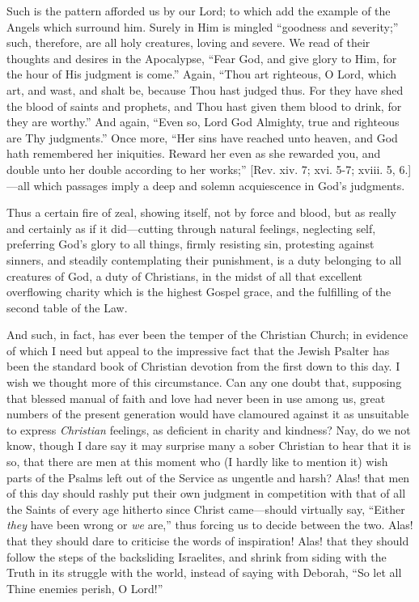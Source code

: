 Such is the pattern afforded us by our Lord; to which add the
example of the Angels which surround him. Surely in Him is mingled
``goodness and severity;'' such, therefore, are all holy
creatures, loving and severe. We read of their thoughts and desires in
the Apocalypse, ``Fear God, and give glory to Him, for the hour of
His judgment is come.'' Again, ``Thou art righteous, O Lord,
which art, and wast, and shalt be, because Thou hast judged thus. For
they have shed the blood of saints and prophets, and Thou hast given
them blood to drink, for they are worthy.'' And again, ``Even
so, Lord God Almighty, true and righteous are Thy judgments.''
Once more, ``Her sins have reached unto heaven, and God hath
remembered her iniquities. Reward her even as she rewarded you, and
double unto her double according to her works;'' [Rev. xiv. 7;
xvi. 5-7; xviii. 5, 6.]—all which passages imply a deep and solemn
acquiescence in God's judgments.

Thus a certain fire of zeal, showing itself, not by force and
blood, but as really and certainly as if it did—cutting through
natural feelings, neglecting self, preferring God's glory to all
things, firmly resisting sin, protesting against sinners, and steadily
contemplating their punishment, is a duty belonging to all creatures
of God, a duty of Christians, in the midst of all that excellent
overflowing charity which is the highest Gospel grace, and the
fulfilling of the second table of the Law.

And such, in fact, has ever been the temper of the Christian
Church; in evidence of which I need but appeal to the impressive fact
that the Jewish Psalter has been the standard book of Christian
devotion from the first down to this day. I wish we thought more of
this circumstance. Can any one doubt that, supposing that blessed
manual of faith and love had never been in use among us, great numbers
of the present generation would have clamoured against it as
unsuitable to express \emph{Christian} feelings, as deficient in
charity and kindness? Nay, do we not know, though I dare say it may
surprise many a sober Christian to hear that it is so, that there are
men at this moment who (I hardly like to mention it) wish parts of the
Psalms left out of the Service as ungentle and harsh? Alas! that men
of this day should rashly put their own judgment in competition with
that of all the Saints of every age hitherto since Christ came—should
virtually say, ``Either \emph{they} have been wrong or \emph{we}
are,'' thus forcing us to decide between the two. Alas! that they
should dare to criticise the words of inspiration! Alas! that they
should follow the steps of the backsliding Israelites, and shrink from
siding with the Truth in its struggle with the world, instead of
saying with Deborah, ``So let all Thine enemies perish, O
Lord!''

